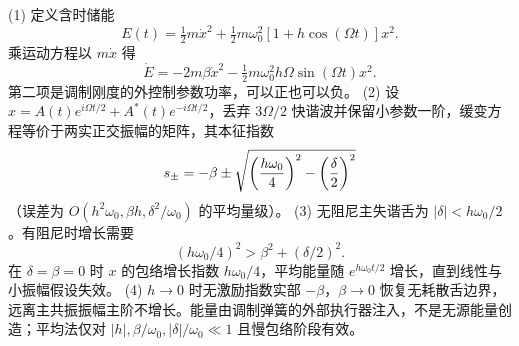 (1) 定义含时储能
\[
E(t)=\tfrac12m\dot x^2+\tfrac12m\omega_0^2[1+h\cos(\Omega t)]x^2.
\]
乘运动方程以 \(m\dot x\) 得
\[
\dot E=-2m\beta\dot x^2-\tfrac12m\omega_0^2h\Omega\sin(\Omega t)x^2.
\]
第二项是调制刚度的外控制参数功率，可以正也可以负。
(2) 设 \(x=A(t)e^{i\Omega t/2}+A^*(t)e^{-i\Omega t/2}\)，丢弃 \(3\Omega/2\) 快谐波并保留小参数一阶，缓变方程等价于两实正交振幅的矩阵，其本征指数
\[
s_\pm=-\beta\pm\sqrt{\left({h\omega_0\over4}\right)^2-\left({\delta\over2}\right)^2}
\]
（误差为 \(O(h^2\omega_0,\beta h,\delta^2/\omega_0)\) 的平均量级）。
(3) 无阻尼主失谐舌为 \(|\delta|<h\omega_0/2\)。有阻尼时增长需要
\[
(h\omega_0/4)^2>\beta^2+(\delta/2)^2.
\]
在 \(\delta=\beta=0\) 时 \(x\) 的包络增长指数 \(h\omega_0/4\)，平均能量随 \(e^{h\omega_0 t/2}\) 增长，直到线性与小振幅假设失效。
(4) \(h\to0\) 时无激励指数实部 \(-\beta\)，\(\beta\to0\) 恢复无耗散舌边界，远离主共振振幅主阶不增长。能量由调制弹簧的外部执行器注入，不是无源能量创造；平均法仅对 \(|h|,\beta/\omega_0,|\delta|/\omega_0\ll1\) 且慢包络阶段有效。
